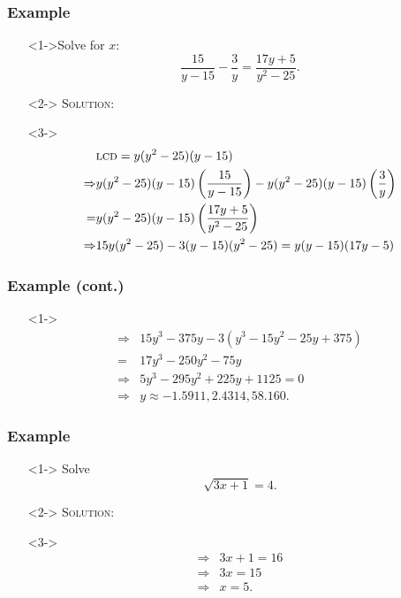 \documentclass[handout]{beamer}
\begin{document}
\begin{frame}
	\frametitle{Example} 
	\begin{enumerate}
		\item[]<1->Solve for $x$: 
		\[
			\frac{15}{y-15}-\frac{3}{y}=\frac{17y+5}{y^{2}-25}.
		\]
		\item[]<2-> \textsc{Solution:} 
		\item[]<3-> 
		\begin{align*}
		& \text{\textsc{lcd}}=y(y^{2}-25)(y-15) \\
		\Rightarrow & y(y^{2}-25)(y-15)\left( \frac{15}{y-15} \right)-y(y^{2}-25)(y-15)\left( \frac{3}{y} \right)  \\
		= & y(y^{2}-25)(y-15)\left( \frac{17y+5}{y^{2}-25} \right)  \\
		\Rightarrow &15y(y^{2}-25)-3(y-15)(y^{2}-25)=y(y-15)(17y-5) 
		\end{align*} 
	\end{enumerate}
\end{frame}

\begin{frame}
	\frametitle{Example (cont.)} 
	\begin{enumerate}
		\item[]<1-> 
		\begin{align*}
		\Rightarrow & 15y^{3}-375y-3(y^{3}-15y^{2}-25y+ 375) \\
			 =& 17y^{3}-250y^{2}-75y  \\
		 		\Rightarrow & 5y^{3}-295y^{2}+225y+1125=0 \\
		\Rightarrow & y \approx -1.5911, 2.4314, 58.160.
		\end{align*}
	\end{enumerate}
\end{frame}

\begin{frame}
	\frametitle{Example} 
	\begin{enumerate}
		\item[]<1-> Solve 
		\[
			\sqrt{3x+1}=4. 
		\]
		\item[]<2-> \textsc{Solution:} 
		\item[]<3-> 
			\begin{align*}
				\Rightarrow & 3x+1=16 \\
				\Rightarrow & 3x=15 \\
				\Rightarrow & x=5. 
			\end{align*} 
	\end{enumerate}
\end{frame}
\end{document}
